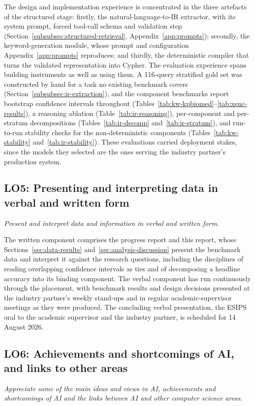 The design and implementation experience is concentrated in the three
artefacts of the structured stage: firstly, the natural-language-to-IR
extractor, with its system prompt, forced tool-call schema and validation
step (Section~\ref{subsubsec:structured-retrieval},
Appendix~\ref{app:prompts}); secondly, the keyword-generation module, whose
prompt and configuration Appendix~\ref{app:prompts} reproduces; and
thirdly, the deterministic compiler that turns the validated representation
into Cypher. The evaluation experience spans building instruments as well
as using them. A 116-query stratified gold set was constructed by hand for
a task no existing benchmark covers (Section~\ref{subsubsec:ir-extraction}),
and the component benchmarks report bootstrap confidence intervals
throughout (Tables~\ref{tab:kw-kpbiomed}--\ref{tab:xenc-results}), a
reasoning ablation (Table~\ref{tab:ir-reasoning}), per-component and
per-stratum decompositions (Tables~\ref{tab:ir-decomp}
and~\ref{tab:ir-stratum}), and run-to-run stability checks for the
non-deterministic components (Tables~\ref{tab:kw-stability}
and~\ref{tab:ir-stability}). These evaluations carried deployment stakes,
since the models they selected are the ones serving the industry partner's
production system.

\subsection{LO5: Presenting and interpreting data in verbal and written form}
\textit{Present and interpret data and information in verbal and written
form.}

The written component comprises the progress report and this report, whose
Sections~\ref{sec:data-results} and~\ref{sec:analysis-discussion} present the benchmark
data and interpret it against the research questions, including the
disciplines of reading overlapping confidence intervals as ties and of
decomposing a headline accuracy into its binding component. The verbal
component has run continuously through the placement, with benchmark
results and design decisions presented at the industry partner's weekly
stand-ups and in regular academic-supervisor meetings as they were
produced. The concluding verbal presentation, the ESIPS oral to the
academic supervisor and the industry partner, is scheduled for
14 August 2026.

\subsection{LO6: Achievements and shortcomings of AI, and links to other areas}
\textit{Appreciate some of the main ideas and views in AI, achievements and
shortcomings of AI and the links between AI and other computer science
areas.}

